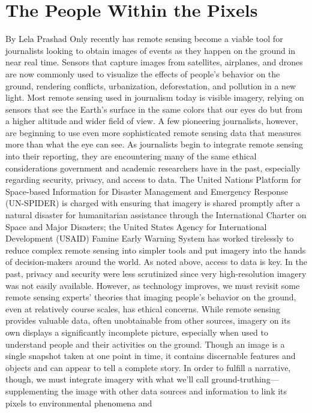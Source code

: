 \section{The People Within the Pixels}
By Lela Prashad
Only recently has remote sensing become a viable tool for journalists looking
to obtain images of events as they happen on the ground in near real
time. Sensors that capture images from satellites, airplanes, and drones
are now commonly used to visualize the effects of people's behavior on the
ground, rendering conflicts, urbanization, deforestation, and pollution in a
new light. Most remote sensing used in journalism today is visible imagery,
relying on sensors that see the Earth's surface in the same colors that our
eyes do but from a higher altitude and wider field of view. A few pioneering
journalists, however, are beginning to use even more sophisticated remote
sensing data that measures more than what the eye can see.
As journalists begin to integrate remote sensing into their reporting, they
are encountering many of the same ethical considerations government
and academic researchers have in the past, especially regarding security,
privacy, and access to data. The United Nations Platform for Space-based
Information for Disaster Management and Emergency Response (UN-SPIDER)
is charged with ensuring that imagery is shared promptly after a natural
disaster for humanitarian assistance through the International Charter
on Space and Major Disasters; the United States Agency for International
Development (USAID) Famine Early Warning System has worked tirelessly
to reduce complex remote sensing into simpler tools and put imagery into
the hands of decision-makers around the world. As noted above, access to
data is key. In the past, privacy and security were less scrutinized since very
high-resolution imagery was not easily available. However, as technology improves, we must revisit some remote sensing experts' theories that imaging
people's behavior on the ground, even at relatively course scales, has
ethical concerns.
While remote sensing provides valuable data, often unobtainable from
other sources, imagery on its own displays a significantly incomplete picture,
especially when used to understand people and their activities on the
ground. Though an image is a single snapshot taken at one point in time, it
contains discernable features and objects and can appear to tell a complete
story. In order to fulfill a narrative, though, we must integrate imagery with
what we'll call ground-truthing—supplementing the image with other data
sources and information to link its pixels to environmental phenomena and
